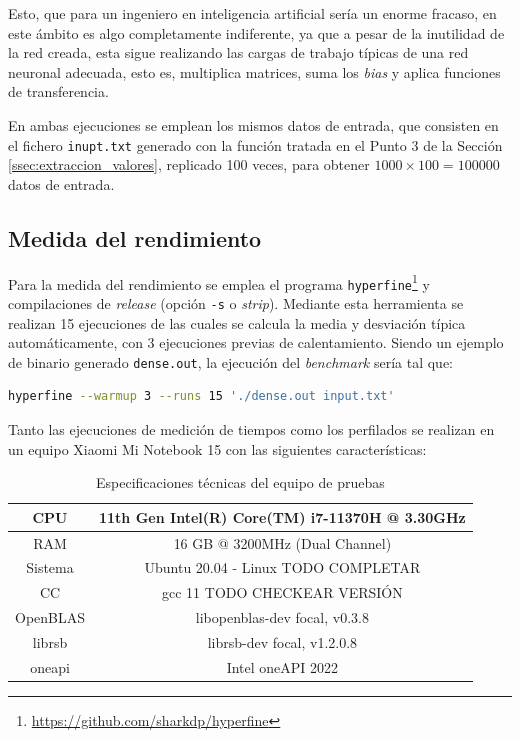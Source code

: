 Esto, que para un ingeniero en inteligencia artificial sería un enorme fracaso, en este ámbito es algo completamente indiferente, ya que a pesar de la inutilidad de la red creada, esta sigue realizando las cargas de trabajo típicas de una red neuronal adecuada, esto es, multiplica matrices, suma los \textit{bias} y aplica funciones de transferencia.

En ambas ejecuciones se emplean los mismos datos de entrada, que consisten en el fichero \texttt{inupt.txt} generado con la función tratada en el Punto 3 de la Sección \ref{ssec:extraccion_valores}, replicado 100 veces, para obtener $1000 \times 100 = 100000$ datos de entrada.

\subsection{Medida del rendimiento}
\label{ssec:medida_rendimiento_metodologia}
Para la medida del rendimiento se emplea el programa \texttt{hyperfine}\footnote{\url{https://github.com/sharkdp/hyperfine}} y compilaciones de \textit{release} (opción \texttt{-s} o \textit{strip}). Mediante esta herramienta se realizan 15 ejecuciones de las cuales se calcula la media y desviación típica automáticamente, con 3 ejecuciones previas de calentamiento. Siendo un ejemplo de binario generado \texttt{dense.out}, la ejecución del \textit{benchmark} sería tal que:\medskip
\begin{lstlisting}[language=bash]
hyperfine --warmup 3 --runs 15 './dense.out input.txt'
\end{lstlisting}

Tanto las ejecuciones de medición de tiempos como los perfilados se realizan en un equipo Xiaomi Mi Notebook 15 con las siguientes características:
\begin{table}
\centering
\begin{tabular}{|c|c|}
    \hline
    CPU & 11th Gen Intel(R) Core(TM) i7-11370H @ 3.30GHz\\\hline
    RAM & 16 GB @ 3200MHz (Dual Channel)\\\hline
    Sistema & Ubuntu 20.04 - Linux TODO COMPLETAR\\\hline
    CC & gcc 11 TODO CHECKEAR VERSIÓN\\\hline
    OpenBLAS & libopenblas-dev focal, v0.3.8\\\hline
    librsb & librsb-dev focal, v1.2.0.8\\\hline
    oneapi & Intel oneAPI 2022\\\hline
\end{tabular}

\label{tab:especificaciones_xiaomi}
\caption{Especificaciones técnicas del equipo de pruebas}
\end{table}


